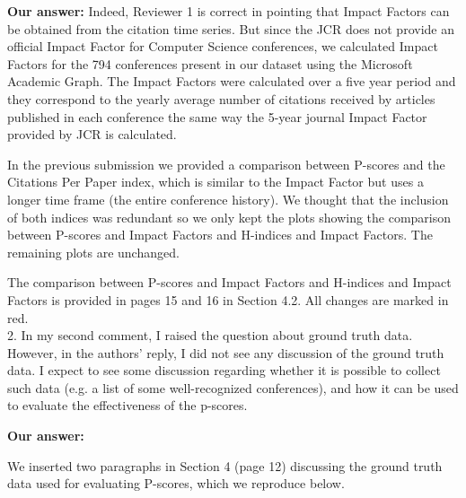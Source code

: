 \documentclass[a4wide,11pt]{article}
\begin{document}
{\bf Our answer:}
Indeed, Reviewer 1 is correct in pointing that Impact Factors can be obtained from the citation 
time series. But since the JCR does not provide an official Impact Factor for Computer Science 
conferences, we calculated Impact Factors for the 794 conferences present in our 
dataset using the Microsoft Academic Graph. The Impact Factors were calculated over 
a five year period and they correspond to the yearly average number of citations received
by articles published in each conference the same way the 5-year journal Impact Factor 
provided by JCR is calculated.

In the previous submission we provided a comparison between P-scores and the 
Citations Per Paper index, which is similar to the Impact Factor but uses a longer time frame
(the entire conference history). We thought that the inclusion of both indices was redundant 
so we only kept the plots showing the comparison between P-scores and Impact Factors and 
H-indices and Impact Factors. The remaining plots are unchanged.

The comparison between P-scores and Impact Factors and H-indices and Impact Factors is 
provided in pages 15 and 16 in Section 4.2. All changes are marked in red.
\\


2. In my second comment, I raised the question about ground truth data. However, in the authors' reply, I did not see any discussion of the ground truth data. I expect to see some discussion regarding whether it is possible to collect such data (e.g. a list of some well-recognized conferences), and how it can be used to evaluate the effectiveness of the p-scores.

{\bf Our answer:}

We inserted two paragraphs in Section 4 (page 12) discussing the ground truth 
data used for evaluating P-scores, which we reproduce below.
\end{document}

